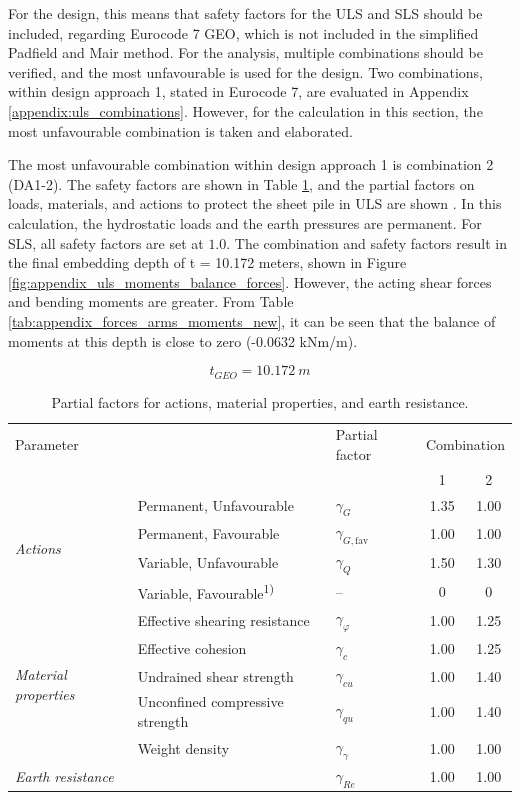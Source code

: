 For the design, this means that safety factors for the ULS and SLS should be included, regarding Eurocode 7 GEO, which is not included in the simplified Padfield and Mair method. For the analysis, multiple combinations should be verified, and the most unfavourable is used for the design. Two combinations, within design approach 1, stated in Eurocode 7, are evaluated in Appendix \ref{appendix:uls_combinations}. However, for the calculation in this section, the most unfavourable combination is taken and elaborated.

The most unfavourable combination within design approach 1 is combination 2 (DA1-2). The safety factors are shown in Table \ref{tab:partial_factors}, and the partial factors on loads, materials, and actions to protect the sheet pile in ULS are shown \autocite{stichtingkoninklijknederlandsnormalisatieinstituutNederlandseNormNEN2025}. In this calculation, the hydrostatic loads and the earth pressures are permanent. For SLS, all safety factors are set at $1.0$. The combination and safety factors result in the final embedding depth of t = 10.172 meters,  shown in Figure \ref{fig:appendix_uls_moments_balance_forces}. However, the acting shear forces and bending moments are greater. From Table \ref{tab:appendix_forces_arms_moments_new}, it can be seen that the balance of moments at this depth is close to zero (-0.0632 kNm/m).

$$
    t_{GEO} = 10.172 \ m
$$

\begin{table}[H]
\centering
\caption{Partial factors for actions, material properties, and earth resistance.}
\small
\setlength{\tabcolsep}{8pt}
\renewcommand{\arraystretch}{1.2}
\begin{tabular}{@{}l l l c c@{}}
\toprule
\multicolumn{1}{l}{Parameter} & 
\multicolumn{1}{l}{ } & 
\multicolumn{1}{l}{Partial factor} & 
\multicolumn{2}{c}{Combination}\\
\cmidrule(lr){4-5}
 & & & 1 & 2 \\
\midrule
\multirow{4}{*}{\textit{Actions}} 
 & Permanent, Unfavourable & $\gamma_G$ & 1.35 & 1.00 \\
 & Permanent, Favourable   & $\gamma_{G,\mathrm{fav}}$ & 1.00 & 1.00 \\
 & Variable, Unfavourable  & $\gamma_Q$ & 1.50 & 1.30 \\
 & Variable, Favourable\textsuperscript{1)} & -- & 0 & 0 \\
\midrule
\multirow{5}{*}{\textit{Material properties}} 
 & Effective shearing resistance & $\gamma_\varphi$ & 1.00 & 1.25 \\
 & Effective cohesion & $\gamma_c$ & 1.00 & 1.25 \\
 & Undrained shear strength & $\gamma_{cu}$ & 1.00 & 1.40 \\
 & Unconfined compressive strength & $\gamma_{qu}$ & 1.00 & 1.40 \\
 & Weight density & $\gamma_\gamma$ & 1.00 & 1.00 \\
\midrule
\textit{Earth resistance} & & $\gamma_{Re}$ & 1.00 & 1.00 \\
\bottomrule
\end{tabular}
\label{tab:partial_factors}
\end{table}

